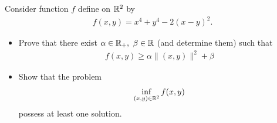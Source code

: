 \documentclass{ExerciseSheet}
\newif\ifsolutions
\begin{document}
\begin{problem}

Consider function $f$ define on $\R^2$ by
  \begin{align*}
      f(x, y) = x^4 + y^4 -2(x - y)^2.
  \end{align*}
  \begin{itemize}
      \item  Prove that there exist $\alpha\in \mathbb{R}_+,$ $\beta\in \mathbb{R}$ (and determine them) such that
      \begin{align*}
          f(x,y)\geq \alpha\|(x,y)\|^2 + \beta
      \end{align*}
    \item  Show that the problem 
        \begin{align} \label{pb}
            \inf_{(x,y)\in \mathbb{R}^2} f(x,y) 
        \end{align}
    possess at least one solution.
    \end{itemize}
\end{problem}

\ifsolutions
\vskip 0.3cm

    \begin{solution}

\begin{enumerate}
    \item A direct computation gives \begin{align*}
        f(x, y) = x^4 + y^4 -2x^2 -2y^2 +4xy
    \end{align*}
    Using the fact that for all $x,y\in\R~xy\geq-\frac{1}{2}(x^2+y^2)$ we get
    \begin{align*}
        f(x, y) &\geq x^4 + y^4 -4x^2 -4y^2 \\
                &= x^4 +\epsilon^4 + y^4 +\epsilon^4 -4x^2 -4y^2 -2\epsilon^4 \text{ for all $\epsilon\in\R$}
    \end{align*}
    Using the fact that for all $x,\epsilon\in\R~x^4+\epsilon^4\geq 2x^2\epsilon^2$ we get
    \begin{align*}
        f(x,y)\geq (2\epsilon^2-4)x^2 + (2\epsilon^2-4)y^2 -2\epsilon^4
    \end{align*}
    the above inequality holds for all $\epsilon\in\R$ in particular for $\epsilon=\sqrt{3}$ that is
    \begin{align}
        f(x,y) &\geq 2(x^2+y^2) - 18\nonumber\\
                &= 2\|(x,y)\|^2 - 18    \label{lowerbound f}    
    \end{align}
    hence, take $\alpha=2$ and $\beta=-18$
    
    \item  Since $\displaystyle\lim_{\|(x,y)\|\to\infty}(2\|(x,y)\|^2 - 18)=\infty$ it follows from $\eqref{lowerbound f}$ $\displaystyle\lim_{\|(x,y)\|\to\infty}f(x,y)=\infty,$ thus, $f$ is coercive on $\R^2$ which closed. Therefore, by Theorem 3.8 of Chapter 1 of the lecture note, problem $\ref{pb}$ has a solution on $\R^2.$
\end{enumerate}
\end{solution}
\fi
\end{document}
